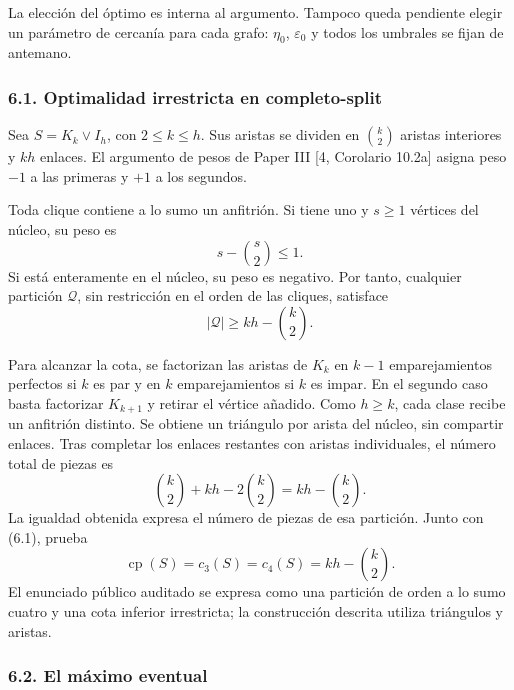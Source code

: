 \documentclass[spanish,11pt,a4paper]{article}
\begin{document}
La elección del óptimo es interna al argumento. Tampoco queda pendiente elegir un parámetro de cercanía para cada grafo: \(\eta_0\), \(\varepsilon_0\) y todos los umbrales se fijan de antemano.

\subsubsection{6.1. Optimalidad irrestricta en completo-split}\label{optimalidad-irrestricta-en-completo-split}

Sea \(S=K_k\vee I_h\), con \(2\le k\le h\). Sus aristas se dividen en \(\binom k2\) aristas interiores y \(kh\) enlaces. El argumento de pesos de Paper III {[}4, Corolario 10.2a{]} asigna peso \(-1\) a las primeras y \(+1\) a los segundos.

Toda clique contiene a lo sumo un anfitrión. Si tiene uno y \(s\ge1\) vértices del núcleo, su peso es \[
s-\binom s2\le1.
\] Si está enteramente en el núcleo, su peso es negativo. Por tanto, cualquier partición \(\mathcal Q\), sin restricción en el orden de las cliques, satisface \[
|\mathcal Q|\ge kh-\binom k2.
\tag{6.1}
\]

Para alcanzar la cota, se factorizan las aristas de \(K_k\) en \(k-1\) emparejamientos perfectos si \(k\) es par y en \(k\) emparejamientos si \(k\) es impar. En el segundo caso basta factorizar \(K_{k+1}\) y retirar el vértice añadido. Como \(h\ge k\), cada clase recibe un anfitrión distinto. Se obtiene un triángulo por arista del núcleo, sin compartir enlaces. Tras completar los enlaces restantes con aristas individuales, el número total de piezas es \[
\binom k2+kh-2\binom k2=kh-\binom k2.
\] La igualdad obtenida expresa el número de piezas de esa partición. Junto con (6.1), prueba \[
\operatorname{cp}(S)=c_3(S)=c_4(S)=kh-\binom k2.
\tag{6.2}
\] El enunciado público auditado se expresa como una partición de orden a lo sumo cuatro y una cota inferior irrestricta; la construcción descrita utiliza triángulos y aristas.

\subsubsection{6.2. El máximo eventual}\label{el-maximo-eventual}
\end{document}
